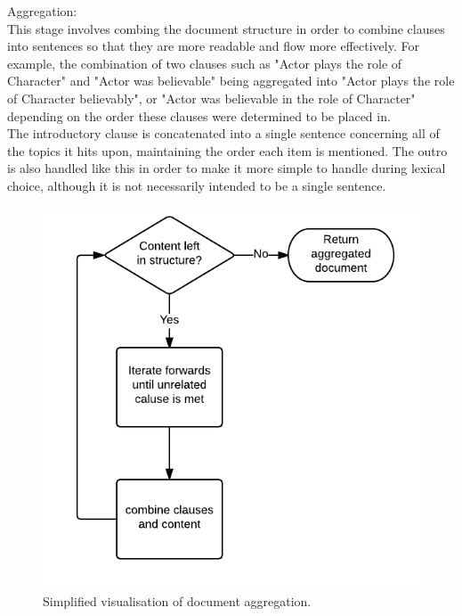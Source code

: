 Aggregation:\\
This stage involves combing the document structure in order to combine clauses into sentences so that they are more readable and flow more effectively. For example, the combination of two clauses such as "Actor plays the role of Character" and "Actor was believable" being aggregated into "Actor plays the role of Character believably", or "Actor was believable in the role of Character" depending on the order these clauses were determined to be placed in.\\
The introductory clause is concatenated into a single sentence concerning all of the topics it hits upon, maintaining the order each item is mentioned. The outro is also handled like this in order to make it more simple to handle during lexical choice, although it is not necessarily intended to be a single sentence.\\

\begin{figure}
\centering
\includegraphics[width=0.7\linewidth]{figures/diagrams_etc/aggregateDocument}
\caption{Simplified visualisation of document aggregation.}
\label{fig:aggregatedocument}
\end{figure}

